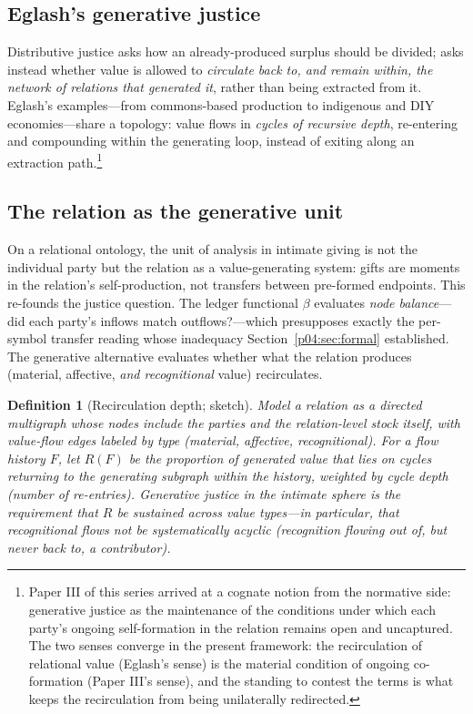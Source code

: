 \documentclass[11pt,a4paper]{article}
\newtheorem{definition}{Definition}
\begin{document}
\subsection{Eglash's generative justice}
Distributive justice asks how an already-produced surplus should be divided;
\textcite{eglash2016} asks instead whether value is allowed to \emph{circulate
back to, and remain within, the network of relations that generated it},
rather than being extracted from it. Eglash's examples---from commons-based
production to indigenous and DIY economies---share a topology: value flows in
\emph{cycles of recursive depth}, re-entering and compounding within the
generating loop, instead of exiting along an extraction path.\footnote{Paper
III of this series \parencite{huang2026vow} arrived at a cognate notion from the
normative side: generative justice as the maintenance of the conditions under
which each party's ongoing self-formation in the relation remains open and
uncaptured. The two senses converge in the present framework: the
recirculation of relational value (Eglash's sense) is the material condition
of ongoing co-formation (Paper III's sense), and the standing to contest the
terms is what keeps the recirculation from being unilaterally redirected.}

\subsection{The relation as the generative unit}
On a relational ontology, the unit of analysis in intimate giving is not the
individual party but the relation as a value-generating system: gifts are
moments in the relation's self-production, not transfers between pre-formed
endpoints. This re-founds the justice question. The ledger functional
$\beta$ evaluates \emph{node balance}---did each party's inflows match
outflows?---which presupposes exactly the per-symbol transfer reading whose
inadequacy Section~\ref{p04:sec:formal} established. The generative alternative
evaluates whether what the relation produces (material, affective,
\emph{and recognitional} value) recirculates.

\begin{definition}[Recirculation depth; sketch]
\label{p04:def:recirc}
Model a relation as a directed multigraph whose nodes include the parties
and the relation-level stock itself, with value-flow edges labeled by type
(material, affective, recognitional). For a flow history $F$, let $R(F)$ be
the proportion of generated value that lies on cycles returning to the
generating subgraph within the history, weighted by cycle depth
(number of re-entries). \emph{Generative justice} in the intimate sphere is
the requirement that $R$ be sustained across value types---in particular,
that recognitional flows not be systematically acyclic (recognition flowing
out of, but never back to, a contributor).
\end{definition}
\end{document}
